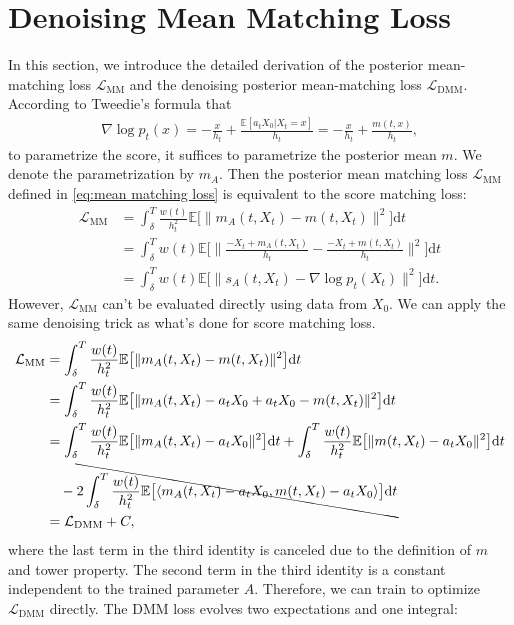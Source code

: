 \documentclass[11pt]{article}
\newcommand{\mb}{\mathbb}
\newcommand{\dee}{\mathrm{d}}
\newcommand{\mc}{\mathcal}
\newcommand{\DMM}{\mc{L}_{\mathrm{DMM}}}
\newcommand{\MM}{\mc{L}_{\mathrm{MM}}}
\begin{document}
\section{Denoising Mean Matching Loss}\label{append:loss} In this section, we introduce the detailed derivation of the posterior mean-matching loss $\MM$ and the denoising posterior mean-matching loss $\DMM$. According to Tweedie's formula that 
\begin{align*}
    \nabla \log p_t(x) =-\frac{x}{h_t}+\frac{\mb{E}[a_tX_0|X_t=x]}{h_t} = -\frac{x}{h_t}+\frac{m(t,x)}{h_t},
\end{align*}
to parametrize the score, it suffices to parametrize the posterior mean $m$. We denote the parametrization by $m_A$. Then the posterior mean matching loss $\MM$ defined in \eqref{eq:mean matching loss} is equivalent to the score matching loss:
\begin{align*}
    \MM & =  \int_\delta^{T} \frac{w(t)}{h_t^2} \mb{E} \big[  \|  m_A(t,X_t) - m(t,X_t) \|^2 \big] \dee t \\
    &= \int_\delta^{T} w(t) \mb{E} \big[  \|  \frac{-X_t+m_A(t,X_t)}{h_t} - \frac{-X_t+m(t,X_t)}{h_t} \|^2 \big] \dee t \\
    & = \int_\delta^{T} w(t) \mb{E} \big[  \|  s_A(t,X_t) - \nabla\log p_t(X_t) \|^2 \big] \dee t.
\end{align*}
However, $\MM$ can't be evaluated directly using data from $X_0$. We can apply the same denoising trick as what's done for score matching loss.
\begin{align*}
    \MM & =  \int_\delta^{T} \frac{w(t)}{h_t^2} \mb{E} \big[  \|  m_A(t,X_t) - m(t,X_t) \|^2 \big] \dee t \\
    & = \int_\delta^{T} \frac{w(t)}{h_t^2} \mb{E} \big[  \|  m_A(t,X_t) -a_t X_0 + a_tX_0 - m(t,X_t) \|^2 \big] \dee t \\
    & = \int_\delta^{T} \frac{w(t)}{h_t^2} \mb{E} \big[  \|  m_A(t,X_t) -a_t X_0  \|^2 \big] \dee t +  \int_\delta^{T} \frac{w(t)}{h_t^2} \mb{E} \big[  \|  m(t,X_t) -a_t X_0  \|^2 \big] \dee t\\
    & \quad -  \bcancel{2 \int_\delta^{T} \frac{w(t)}{h_t^2} \mb{E} \big[  \langle m_A(t,X_t) -a_t X_0, m(t,X_t) -a_t X_0 \rangle  \big] \dee t} \\
    & = \DMM + C,
\end{align*}
where the last term in the third identity is canceled due to the definition of $m$ and tower property. The second term in the third identity is a constant independent to the trained parameter $A$. Therefore, we can train to optimize $\DMM$ directly. The DMM loss evolves two expectations and one integral:
\end{document}
